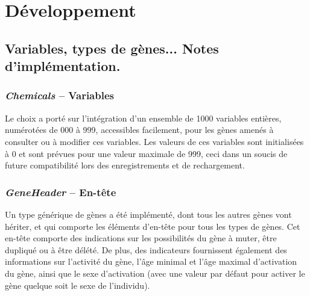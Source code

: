 \documentclass[11pt,twoside,a4paper]{article}
\begin{document}
\clearpage

\section{D{\'e}veloppement}



\subsection{Variables, types de g{\`e}nes... Notes d'impl{\'e}mentation. }

\subsubsection{\emph{Chemicals} -- Variables}

Le choix a port{\'e} sur l'int{\'e}gration d'un ensemble de 1000 variables enti{\`e}res, num{\'e}rot{\'e}es de 000 {\`a} 999, accessibles facilement, pour les g{\`e}nes amen{\'e}s {\`a} consulter ou {\`a} modifier ces variables. Les valeurs de ces variables sont initialis{\'e}es {\`a} 0 et sont pr{\'e}vues pour une valeur maximale de 999, ceci dans un soucis de future compatibilit{\'e} lors des enregistrements et de rechargement.

\subsubsection{\emph{GeneHeader} -- En-t{\^e}te}

Un type g{\'e}n{\'e}rique de g{\`e}nes a {\'e}t{\'e} impl{\'e}ment{\'e}, dont tous les autres g{\`e}nes vont h{\'e}riter, et qui comporte les {\'e}l{\'e}ments d'en-t{\^e}te pour tous les types de g{\`e}nes. Cet en-t{\^e}te comporte des indications sur les possibilit{\'e}s du g{\`e}ne {\`a} muter, {\^e}tre dupliqu{\'e} ou {\`a} {\^e}tre d{\'e}l{\'e}t{\'e}. De plus, des indicateurs fournissent {\'e}galement des informations sur l'activit{\'e} du g{\`e}ne, l'{\^a}ge minimal et l'{\^a}ge maximal d'activation du g{\`e}ne, ainsi que le sexe d'activation (avec une valeur par d{\'e}faut pour activer le g{\`e}ne quelque soit le sexe de l'individu).
\end{document}
